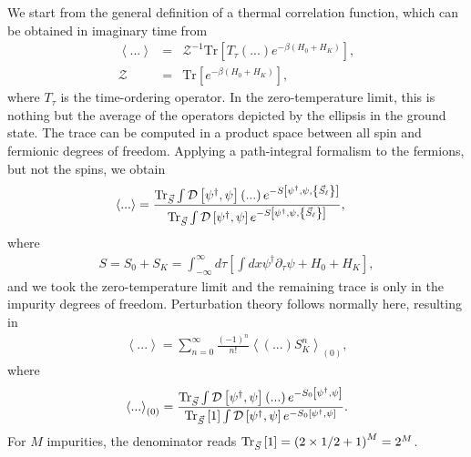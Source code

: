 \documentclass[aps,prb,twocolumn,superscriptaddress]{revtex4-1}
\newcommand{\Tr}[1]{\mathrm{Tr} #1}
\begin{document}
\begin{widetext}
We start from the general definition of a thermal correlation function, which can be obtained in imaginary time from
\begin{eqnarray}
\left\langle ...\right\rangle &=&\mathcal{Z}^{-1}\Tr\left[T_{\tau}\left(...\right)e^{-\beta\left(H_{0}+H_{K}\right)}\right],\\
\mathcal{Z}&=&\Tr\left[e^{-\beta\left(H_{0}+H_{K}\right)}\right],
\end{eqnarray}
where $T_{\tau}$ is the time-ordering operator. In the zero-temperature limit, this is nothing but the average of the operators depicted by the ellipsis in the ground state. 
The trace can be computed in a product space between all spin and fermionic degrees of freedom. Applying a path-integral formalism to the fermions, but not the spins, we obtain
\begin{eqnarray}
\left\langle ...\right\rangle &=\frac{\Tr_{\vec{S}}\int\mathcal{D}\left[\psi^{\dagger},\psi\right]\left(...\right)e^{-S\left[\psi^{\dagger},\psi,\left\{ \vec{S}_{\ell}\right\} \right]}}{\Tr_{\vec{S}}\int\mathcal{D}\left[\psi^{\dagger},\psi\right]e^{-S\left[\psi^{\dagger},\psi,\left\{ \vec{S}_{\ell}\right\} \right]}},
\end{eqnarray}
where 
\begin{eqnarray}
S=S_{0}+S_{K}=\int_{-\infty}^{\infty}d\tau\left[\int dx\psi^{\dagger}\partial_{\tau}\psi+H_{0}+H_{K}\right],
\end{eqnarray}
and we took the zero-temperature limit and the remaining trace is only in the impurity degrees of freedom. Perturbation theory follows normally here, resulting in
\begin{eqnarray}
\left\langle ...\right\rangle =\sum_{n=0}^{\infty}\frac{\left(-1\right)^{n}}{n!}\left\langle \left(...\right)S_{K}^{n}\right\rangle _{(0)},
\end{eqnarray}
where
\begin{eqnarray}
\left\langle ...\right\rangle _{(0)}=\frac{\Tr_{\vec{S}}\int\mathcal{D}\left[\psi^{\dagger},\psi\right]\left(...\right)e^{-S_{0}\left[\psi^{\dagger},\psi\right]}}{\Tr_{\vec{S}}\left[1\right]\int\mathcal{D}\left[\psi^{\dagger},\psi\right]e^{-S_{0}\left[\psi^{\dagger},\psi\right]}}.
\end{eqnarray}
For $M$ impurities, the denominator reads $\Tr_{\vec{S}}\left[1\right]=\left(2\times1/2+1\right)^{M}=2^{M}$.


\end{widetext}
\end{document}
